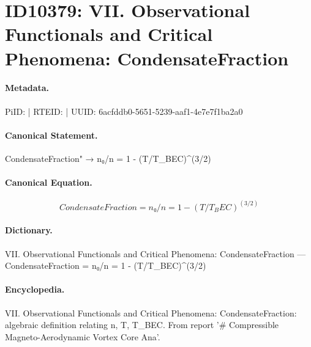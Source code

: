 \section*{ID10379: VII. Observational Functionals and Critical Phenomena: CondensateFraction}
\paragraph{Metadata.}
PiID:  | RTEID:  | UUID: 6acfddb0-5651-5239-aaf1-4e7e7f1ba2a0

\paragraph{Canonical Statement.}
CondensateFraction" → n₀/n = 1 - (T/T\_BEC)\textasciicircum{}(3/2)

\paragraph{Canonical Equation.}
\[
CondensateFraction = n₀/n = 1 - (T/T_BEC)^(3/2)
\]

\paragraph{Dictionary.}
VII. Observational Functionals and Critical Phenomena: CondensateFraction — CondensateFraction = n₀/n = 1 - (T/T\_BEC)\textasciicircum{}(3/2)

\paragraph{Encyclopedia.}
VII. Observational Functionals and Critical Phenomena: CondensateFraction: algebraic definition relating n, T, T\_BEC. From report '\# Compressible Magneto-Aerodynamic Vortex Core Ana'.
